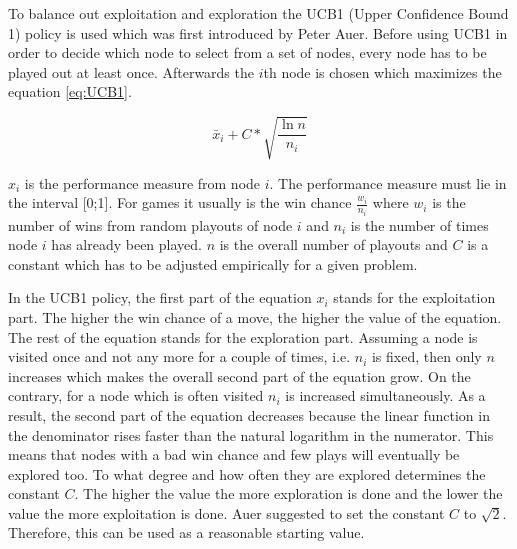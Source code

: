 \documentclass[english]{report}
\begin{document}
To balance out exploitation and exploration the UCB1 (Upper Confidence Bound 1)
policy is used which was first introduced by Peter Auer.\cite{paper:ucb1}
Before using UCB1 in order to decide which node to select from a set of nodes,
every node has to be played out at least once. Afterwards the \(i\)th node is
chosen which maximizes the equation \ref{eq:UCB1}.

\begin{equation}
\label{eq:UCB1}
\bar{x}_{i} + C * \sqrt{\frac{\ln n}{n_{i}}}
\end{equation}

\(x_{i}\) is the performance measure from node \(i\). The performance measure
must lie in the interval [0;1]. For games it usually is the win chance
\(\frac{w_{i}}{n_{i}}\) where \(w_{i}\) is the number of wins from random
playouts of node \(i\) and \(n_{i}\) is the number of times node \(i\) has
already been played. \(n\) is the overall number of playouts and \(C\) is a
constant which has to be adjusted empirically for a given problem.\cite{thesis:uct}


In the UCB1 policy, the first part of the equation \(x_{i}\) stands for the
exploitation part. The higher the win chance of a move, the higher the value of
the equation. The rest of the equation stands for the exploration part. Assuming
a node is visited once and not any more for a couple of times, i.e. \(n_{i}\) is
fixed, then only \(n\) increases which makes the overall second part of the
equation grow. On the contrary, for a node which is often visited \(n_{i}\) is
increased simultaneously. As a result, the second part of the equation decreases
because the linear function in the denominator rises faster than the natural
logarithm in the numerator. This means that nodes with a bad win chance and few
plays will eventually be explored too. To what degree and how often they are
explored determines the constant \(C\). The higher the value the more
exploration is done and the lower the value the more exploitation is done.
Auer suggested to set the constant \(C\) to
\(\sqrt{2}\).\cite{paper:ucb1} Therefore, this can be used as a
reasonable starting value.
\end{document}
